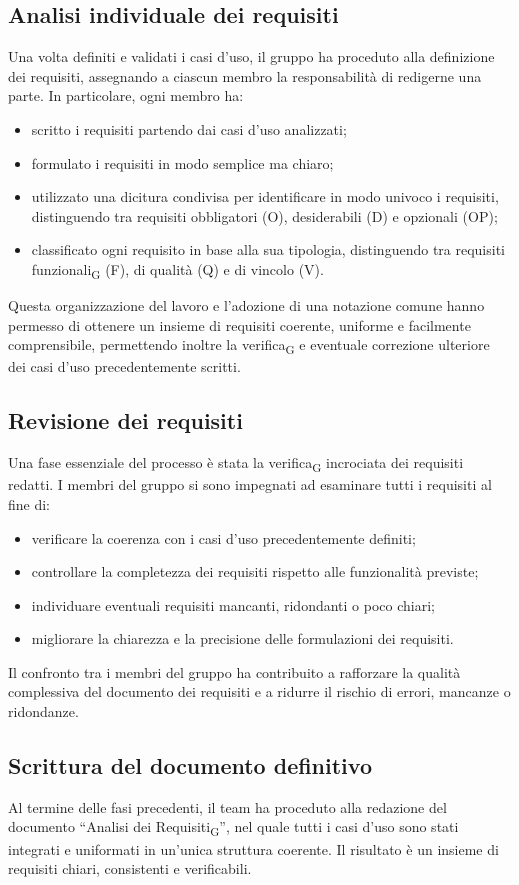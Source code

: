 \documentclass[11pt,a4paper]{article}
\newcommand{\gls}[1]{#1\textsubscript{G}}
\begin{document}
\subsection{Analisi individuale dei requisiti}
Una volta definiti e validati i casi d’uso, il gruppo ha proceduto alla definizione dei requisiti, assegnando a ciascun membro la responsabilità di redigerne una parte. In particolare, ogni membro ha:
\begin{itemize}
\item scritto i requisiti partendo dai casi d’uso analizzati;
\item formulato i requisiti in modo semplice ma chiaro;
\item utilizzato una dicitura condivisa per identificare in modo univoco i requisiti, distinguendo tra requisiti obbligatori (O), desiderabili (D) e opzionali (OP);
\item classificato ogni requisito in base alla sua tipologia, distinguendo tra \gls{requisiti funzionali} (F), di qualità (Q) e di vincolo (V).
\end{itemize}
Questa organizzazione del lavoro e l’adozione di una notazione comune hanno permesso di ottenere un insieme di requisiti coerente, uniforme e facilmente comprensibile, permettendo inoltre la \gls{verifica} e eventuale correzione ulteriore dei casi d’uso precedentemente scritti.

\subsection{Revisione dei requisiti}
Una fase essenziale del processo è stata la \gls{verifica} incrociata dei requisiti redatti. I membri del gruppo si sono impegnati ad esaminare tutti i requisiti al fine di:
\begin{itemize}
\item verificare la coerenza con i casi d’uso precedentemente definiti;
\item controllare la completezza dei requisiti rispetto alle funzionalità previste;
\item individuare eventuali requisiti mancanti, ridondanti o poco chiari;
\item migliorare la chiarezza e la precisione delle formulazioni dei requisiti.
\end{itemize}
Il confronto tra i membri del gruppo ha contribuito a rafforzare la qualità complessiva del documento dei requisiti e a ridurre il rischio di errori, mancanze o ridondanze.

\subsection{Scrittura del documento definitivo}
Al termine delle fasi precedenti, il team ha proceduto alla redazione del documento “\gls{Analisi dei Requisiti}”, nel quale tutti i casi d’uso sono stati integrati e uniformati in un’unica struttura coerente. Il risultato è un insieme di requisiti chiari, consistenti e verificabili.
\end{document}
